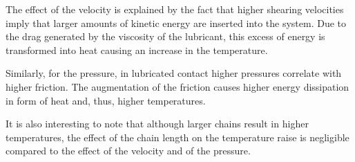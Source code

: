 \documentclass[aps,prb,reprint,superscriptaddress, a4paper]{revtex4-1}
\begin{document}
The effect of the velocity is explained by the fact that higher shearing velocities imply that larger amounts of kinetic energy are inserted into the system. Due to the drag generated by the viscosity of the lubricant, this excess of  energy is transformed into heat causing an increase in the temperature. 

Similarly, for the pressure, in lubricated contact higher pressures correlate with higher friction. The augmentation of the friction causes higher energy dissipation in form of heat and, thus, higher temperatures. 

It is also interesting to note that although larger chains result in  higher temperatures, the effect of the  chain length on the temperature raise is negligible compared to the effect of the velocity and of the pressure. 
\end{document}
